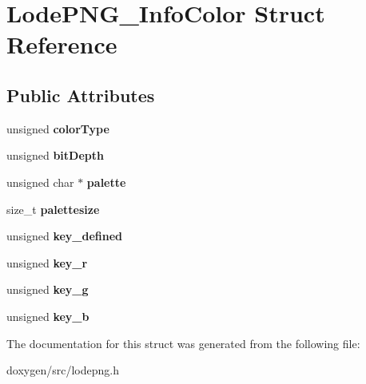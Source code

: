 \hypertarget{struct_lode_p_n_g___info_color}{}\section{Lode\+P\+N\+G\+\_\+\+Info\+Color Struct Reference}
\label{struct_lode_p_n_g___info_color}
\subsection*{Public Attributes}
\begin{DoxyCompactItemize}
\item 
\mbox{\label{struct_lode_p_n_g___info_color_a4ed18d179c5078137a18e742b1c41a00}} 
unsigned {\bfseries color\+Type}
\item 
\mbox{\label{struct_lode_p_n_g___info_color_a9d538965a46d59bbdea744da8b290591}} 
unsigned {\bfseries bit\+Depth}
\item 
\mbox{\label{struct_lode_p_n_g___info_color_ac6de7ff58cb1f39a73567abb826f72f5}} 
unsigned char $\ast$ {\bfseries palette}
\item 
\mbox{\label{struct_lode_p_n_g___info_color_a49842a304ffd0abc8aa791030c5fa5dd}} 
size\+\_\+t {\bfseries palettesize}
\item 
\mbox{\label{struct_lode_p_n_g___info_color_aa0193ce13025c776a0dfb1e6d1bed14a}} 
unsigned {\bfseries key\+\_\+defined}
\item 
\mbox{\label{struct_lode_p_n_g___info_color_a5536a8859201cd11df789ec7ad8263df}} 
unsigned {\bfseries key\+\_\+r}
\item 
\mbox{\label{struct_lode_p_n_g___info_color_a44bf4906335328972acebd6c8b83a073}} 
unsigned {\bfseries key\+\_\+g}
\item 
\mbox{\label{struct_lode_p_n_g___info_color_a9f99cc5b4366f1eed325d13b4f191560}} 
unsigned {\bfseries key\+\_\+b}
\end{DoxyCompactItemize}


The documentation for this struct was generated from the following file\+:\begin{DoxyCompactItemize}
\item 
doxygen/src/lodepng.\+h\end{DoxyCompactItemize}
